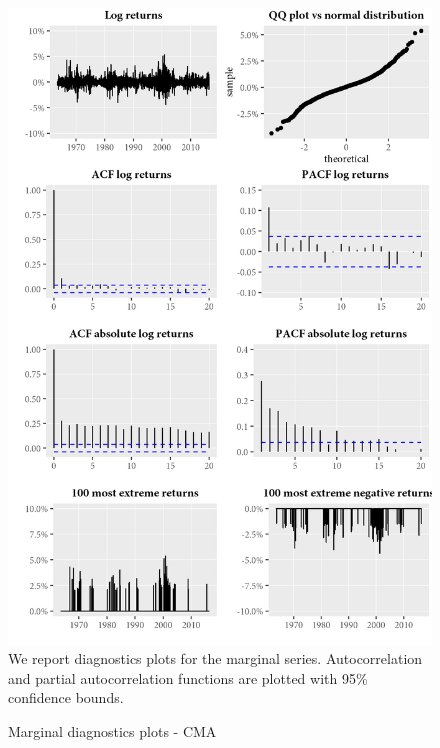 \begin{figure}[H]
  \caption{Marginal diagnostics plots - CMA}
  \label{diag:marginaldiagCMA}
  \toprule
  \centering
  \begin{minipage}{\textwidth}
  \includegraphics[scale=1]{graphics/marginal/MarginalStats.CMA.Estim.png}  
  \bottomrule
  \vspace{3mm}
  \footnotesize
  We report diagnostics plots for the marginal series. Autocorrelation and partial autocorrelation functions are plotted with 95\% confidence bounds. 
  \end{minipage}
\end{figure}
